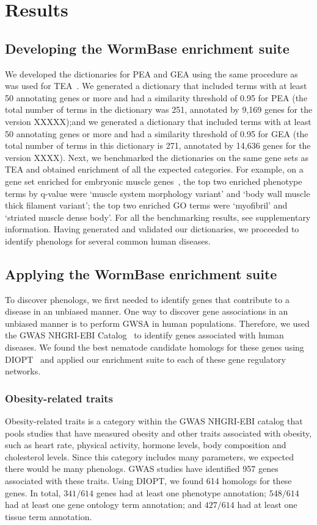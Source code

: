 \documentclass[10pt,letterpaper,twocolumn]{article}
\newcommand{\hobesity}{957}
\newcommand{\wobesity}{614}
\begin{document}
\section*{Results}
\subsection*{Developing the WormBase enrichment suite}
We developed the dictionaries for PEA and GEA using the same procedure as was
used for TEA~\cite{}. We generated a dictionary that included terms with at
least 50 annotating genes or more and had a similarity threshold of 0.95 for PEA
(the total number of terms in the dictionary was 251, annotated by 9,169 genes
 for the version XXXXX);\@ and we generated a
dictionary that included terms with at least 50 annotating genes or more and
had a similarity threshold of 0.95 for GEA (the total number of terms in this
dictionary is 271, annotated by 14,636 genes for the version XXXX).
\@ Next, we benchmarked the dictionaries on the same gene
sets as TEA and obtained enrichment of all the expected categories. For example,
on a gene set enriched for embryonic muscle genes~\cite{}, the top two enriched
phenotype terms by q-value were `muscle system morphology variant' and `body
wall muscle thick filament variant'; the top two enriched GO terms were
`myofibril' and `striated muscle dense body'. For all the benchmarking
results, see supplementary information. Having generated and validated our
dictionaries, we proceeded to identify phenologs for several common human
diseases.

\subsection*{Applying the WormBase enrichment suite}
To discover phenologs, we first needed to identify genes that
contribute to a disease in an unbiased manner. One way to discover gene
associations in an unbiased manner is to perform GWSA in human populations.
Therefore, we used the GWAS NHGRI-EBI
Catalog~\cite{} to identify genes associated with human diseases. We found the
best nematode candidate homologs for these genes using DIOPT~\cite{} and applied
our enrichment suite to each of these gene regulatory networks.

\subsubsection*{Obesity-related traits}
Obesity-related traits is a category within the GWAS NHGRI-EBI catalog that
pools studies that have measured obesity and other traits associated with
obesity, such as heart rate, physical activity, hormone levels, body composition
and cholesterol levels. Since this category includes many parameters,
we expected there would be many phenologs. GWAS studies have identified
\hobesity{} genes associated with these traits. Using DIOPT, we found
\wobesity{} homologs for these genes. In total, $341/\wobesity{}$ genes had
at least one phenotype annotation; $548/\wobesity{}$ had at least one gene ontology term
annotation; and $427/\wobesity{}$ had at least one tissue term annotation.
\end{document}
